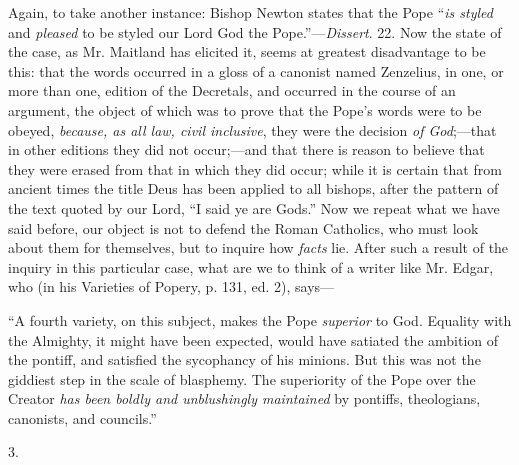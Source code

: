 Again, to take another instance: Bishop Newton states that the Pope
``\emph{is styled} and \emph{pleased} to be styled our Lord God
the Pope.''—\emph{Dissert}. 22. Now the state of the case, as
Mr. Maitland has elicited it, seems at greatest disadvantage to be
this: that the words occurred in a gloss of a canonist named Zenzelius,
in one, or more than one, edition of the Decretals, and occurred in
the course of an argument, the object of which was to prove that the
Pope's words were to be obeyed, \emph{because, as all law, civil
inclusive}, they were the decision \emph{of God};—that in other
editions they did not occur;—and that there is reason to believe
that they were erased from that in which they did occur; while it is
certain that from ancient times the title Deus has been applied to all
bishops, after the pattern of the text quoted by our Lord, ``I
said ye are Gods.'' Now we repeat what we have said before, our
object is not to defend the Roman Catholics, who must look about them
for themselves, but to inquire how \emph{facts} lie. After such a
result of the inquiry in this particular case, what are we to think of
a writer like Mr. Edgar, who (in his Varieties of Popery, p. 131, ed.
2), says—

``A fourth variety, on this subject, makes the Pope \emph{superior}
to God. Equality with the Almighty, it might have been expected, would
have satiated the ambition of the pontiff, and satisfied the
sycophancy of his minions. But this was not the giddiest step in the
scale of blasphemy. The superiority of the Pope over the Creator \emph{has
been boldly and unblushingly maintained} by pontiffs, theologians,
canonists, and councils.''

3.

